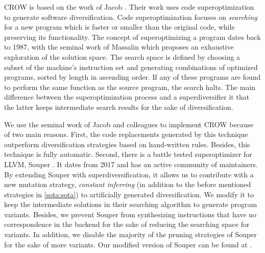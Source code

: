 CROW is based on the work of Jacob \etal \cite{jacob2008superdiversifier}. Their work uses code superoptimization to generate software diversification. 
Code superoptimization focuses on \emph{searching} for a new program which is faster or smaller than the original code, while preserving its functionality.
The concept of superoptimizing a program dates back to 1987, with the seminal work of Massalin \cite{Massalin1987} which proposes an exhaustive exploration of the solution space. The search space is defined by choosing a subset of the machine's instruction set and generating combinations of optimized programs, sorted by length in ascending order. If any of these programs are found to perform the same function as the source program, the search halts. The main difference between the superoptimization process and a superdiversifier it that the latter keeps intermediate search results for the sake of diversification. 

We use the seminal work of Jacob and colleagues to implement CROW because of two main reasons.
First, the code replacements generated by this technique outperform diversification strategies based on hand-written rules. Besides, this technique is fully automatic.
Second, there is a battle tested superoptimizer for LLVM, Souper \cite{Sasnauskas2017Souper:Superoptimizer}. It dates from 2017 and has an active community of maintainers. By extending Souper with superdiversification, it allows us to contribute with a new mutation strategy, \emph{constant inferring} (in addition to the before mentioned strategies in \autoref{sota:sota}) to artificially generated diversification. We modify it to keep the intermediate solutions in their searching algorithm to generate program variants. Besides, 
we prevent Souper from synthesizing instructions that have no correspondence in the \wasm backend for the sake of reducing the searching space for variants. In addition, we disable the majority of the pruning strategies of Souper for the sake of more variants. Our modified version of Souper can be found at \todo{}.




